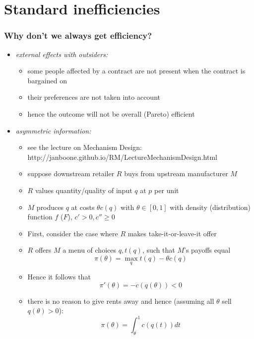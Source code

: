 \documentclass[11pt,english]{beamer}
\begin{document}
\section{Standard inefficiencies}

\begin{frame}[allowframebreaks]\frametitle{Why don't we always get efficiency?}

  \begin{itemize}
  \item \emph{external effects with outsiders:}
    \begin{itemize}
    \item some people affected by a contract are not present when the
      contract is bargained on
    \item their preferences are not taken into account
    \item hence the outcome will not be overall (Pareto) efficient
    \end{itemize}
  \item \emph{asymmetric information:}
    \begin{itemize}
    \item see the lecture on Mechanism Design: http://janboone.github.io/RM/LectureMechanismDesign.html
    \item suppose downstream retailer $R$ buys from upstream
      manufacturer $M$
    \item $R$ values quantity/quality of input $q$ at $p$ per unit
    \item $M$ produces $q$ at costs $\theta c(q)$ with $\theta \in
      [0,1]$ with density (distribution) function $f$ ($F$), $c'>0,c''
      \geq 0$
    \item First, consider the case where $R$ makes take-it-or-leave-it
      offer
    \item $R$ offers $M$ a menu of choices $q,t(q)$, such that $M$'s
      payoffs equal
      \begin{equation*}
        \pi(\theta) = \max_q t(q)-\theta c(q)
      \end{equation*}
    \item Hence it follows that
    \begin{equation}
      \label{eq:ICasyminfo}
      \pi'(\theta) = -c(q(\theta)) <0
    \end{equation}
  \item there is no reason to give rents away and hence (assuming all
    $\theta$ sell $q(\theta)>0$):
    \begin{equation*}
      \pi(\theta) = \int_{\theta}^1 c(q(t))dt

\end{equation*}
\end{itemize}
\end{itemize}
\end{frame}
\end{document}

